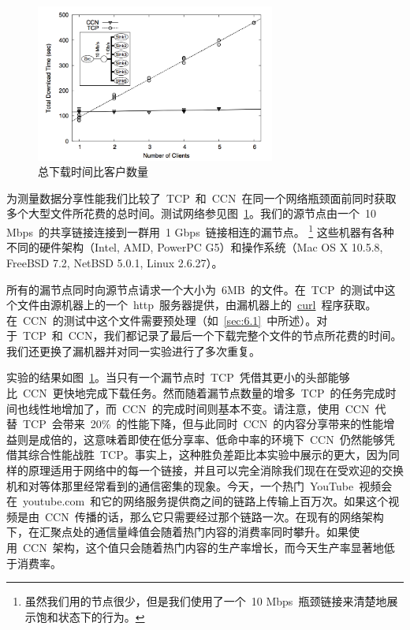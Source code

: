 \begin{figure}[htbp]
\begin{center}
\includegraphics[width=0.7\textwidth]{images/share_performance}
\caption{总下载时间比客户数量}
\label{share_performance}
\end{center}
\end{figure}

为测量数据分享性能我们比较了~TCP~和~CCN~在同一个网络瓶颈面前同时获取多个大型文件所花费的总时间。测试网络参见图~\ref{share_performance}。我们的源节点由一个~10 Mbps~的共享链接连接到一群用~1 Gbps~链接相连的漏节点。
\renewcommand\baselinestretch{1} %
\footnote{虽然我们用的节点很少，但是我们使用了一个~10 Mbps~瓶颈链接来清楚地展示饱和状态下的行为。}
这些机器有各种不同的硬件架构（Intel, AMD, PowerPC G5）和操作系统（Mac OS X 10.5.8, FreeBSD 7.2, NetBSD 5.0.1, Linux 2.6.27）。

所有的漏节点同时向源节点请求一个大小为~6MB~的文件。在~TCP~的测试中这个文件由源机器上的一个~http~服务器提供，由漏机器上的~\url{curl}~程序获取。在~CCN~的测试中这个文件需要预处理（如~\ref{sec:6.1}~中所述）。对于~TCP~和~CCN，我们都记录了最后一个下载完整个文件的节点所花费的时间。我们还更换了漏机器并对同一实验进行了多次重复。

实验的结果如图~\ref{share_performance}。当只有一个漏节点时~TCP~凭借其更小的头部能够比~CCN~更快地完成下载任务。然而随着漏节点数量的增多~TCP~的任务完成时间也线性地增加了，而~CCN~的完成时间则基本不变。请注意，使用~CCN~代替~TCP~会带来~20\%~的性能下降，但与此同时~CCN~的内容分享带来的性能增益则是成倍的，这意味着即使在低分享率、低命中率的环境下~CCN~仍然能够凭借其综合性能战胜~TCP。事实上，这种胜负差距比本实验中展示的更大，因为同样的原理适用于网络中的每一个链接，并且可以完全消除我们现在在受欢迎的交换机和对等体那里经常看到的通信密集的现象。今天，一个热门~YouTube~视频会在~youtube.com~和它的网络服务提供商之间的链路上传输上百万次。如果这个视频是由~CCN~传播的话，那么它只需要经过那个链路一次。在现有的网络架构下，在汇聚点处的通信量峰值会随着热门内容的消费率同时攀升。如果使用~CCN~架构，这个值只会随着热门内容的生产率增长，而今天生产率显著地低于消费率。

